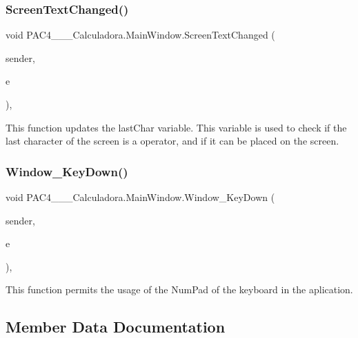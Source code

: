 \subsubsection{\texorpdfstring{Screen\+Text\+Changed()}{ScreenTextChanged()}}
{\footnotesize\ttfamily void P\+A\+C4\+\_\+\+\_\+\+\_\+\+Calculadora.\+Main\+Window.\+Screen\+Text\+Changed (\begin{DoxyParamCaption}\item[{object}]{sender,  }\item[{Text\+Changed\+Event\+Args}]{e }\end{DoxyParamCaption})\hspace{0.3cm}{\ttfamily [inline]}, {\ttfamily [private]}}



This function updates the last\+Char variable. This variable is used to check if the last character of the screen is a operator, and if it can be placed on the screen. 

\mbox{\label{class_p_a_c4_______calculadora_1_1_main_window_a45c2b3e046115db99c9e662f6a002afd}} 
\subsubsection{\texorpdfstring{Window\+\_\+\+Key\+Down()}{Window\_KeyDown()}}
{\footnotesize\ttfamily void P\+A\+C4\+\_\+\+\_\+\+\_\+\+Calculadora.\+Main\+Window.\+Window\+\_\+\+Key\+Down (\begin{DoxyParamCaption}\item[{object}]{sender,  }\item[{Key\+Event\+Args}]{e }\end{DoxyParamCaption})\hspace{0.3cm}{\ttfamily [inline]}, {\ttfamily [private]}}



This function permits the usage of the Num\+Pad of the keyboard in the aplication. 



\subsection{Member Data Documentation}
\mbox{\label{class_p_a_c4_______calculadora_1_1_main_window_a4c5f3600067730fbb48d6c7c5d2c8912}} 

